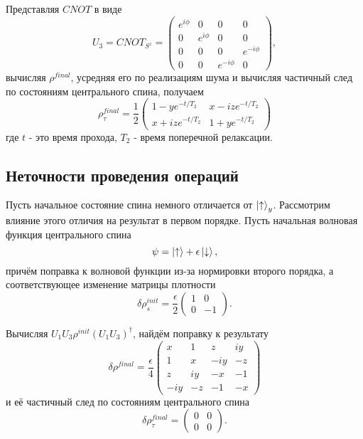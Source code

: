 \documentclass[a4paper,12pt]{article}
\theoremstyle{plain} %
\theoremstyle{definition} %
\theoremstyle{remark} %
\begin{document}
Представляя $CNOT$ в виде
\begin{equation}
U_3 = CNOT_{S^z} = 
\begin{pmatrix}
e^{i \phi} & 0 & 0 & 0 \\
0 & e^{i \phi} & 0 & 0 \\
0 & 0 & 0 & e^{-i \phi} \\
0 & 0 & e^{-i \phi} & 0
\end{pmatrix},
\end{equation}
вычисляя $\rho^{final}$, усредняя его по реализациям шума и вычисляя частичный след по состояниям центрального спина, получаем
\begin{equation}
\rho^{final}_\tau = \frac{1}{2}
\begin{pmatrix}
1 - y e^{-t/T_2} & x - i z e^{-t/T_2} \\
x + i z e^{-t/T_2} & 1 + y e^{-t/T_2}
\end{pmatrix}
\end{equation}
где $t$ - это время прохода, $T_2$ - время поперечной релаксации. 

\subsection{Неточности проведения операций} \label{subsec:operations}

Пусть начальное состояние спина немного отличается от $\ket{\uparrow}_y$. Рассмотрим влияние этого отличия на результат в первом порядке. 
Пусть начальная волновая функция центрального спина
\begin{equation}
    \psi = \ket{\uparrow} + \epsilon \ket{\downarrow},
\end{equation}
причём поправка к волновой функции из-за нормировки второго порядка, а соответствующее изменение матрицы плотности
\begin{equation}
    \delta\rho^{init}_s = \frac{\epsilon}{2}
    \begin{pmatrix}
        1 & 0 \\
        0 & -1 
    \end{pmatrix}.
\end{equation}

Вычисляя $U_1 U_3 \rho^{init} (U_1 U_3)^\dagger$, найдём поправку к результату
\begin{equation}
    \delta \rho^{final} = \frac{\epsilon}{4}
    \begin{pmatrix}
        x & 1 & z & i y \\
        1 & x & - i y & -z \\
        z & i y & -x & -1 \\
        - i y & - z & -1 & -x
    \end{pmatrix}
\end{equation}
и её частичный след по состояниям центрального спина
\begin{equation}
    \delta \rho^{final}_\tau = 
    \begin{pmatrix}
        0 & 0 \\
        0 & 0
    \end{pmatrix}.
\end{equation}
\end{document}

